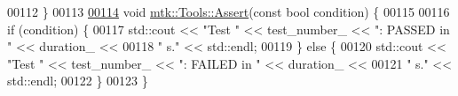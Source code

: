 \begin{DoxyCode}
00112 \}
00113 
\hypertarget{mtk__tools_8cc_source_l00114}{}\hyperlink{classmtk_1_1Tools_aa311fada9255627d06c56b1e4fedce9e}{00114} \textcolor{keywordtype}{void} \hyperlink{classmtk_1_1Tools_aa311fada9255627d06c56b1e4fedce9e}{mtk::Tools::Assert}(\textcolor{keyword}{const} \textcolor{keywordtype}{bool} condition) \{
00115 
00116   \textcolor{keywordflow}{if} (condition) \{
00117     std::cout << \textcolor{stringliteral}{"Test "} << test\_number\_ << \textcolor{stringliteral}{": PASSED in "} << duration\_ <<
00118       \textcolor{stringliteral}{" s."} << std::endl;
00119   \} \textcolor{keywordflow}{else} \{
00120     std::cout << \textcolor{stringliteral}{"Test "} << test\_number\_ << \textcolor{stringliteral}{": FAILED in "} << duration\_ <<
00121       \textcolor{stringliteral}{" s."} << std::endl;
00122   \}
00123 \}
\end{DoxyCode}
